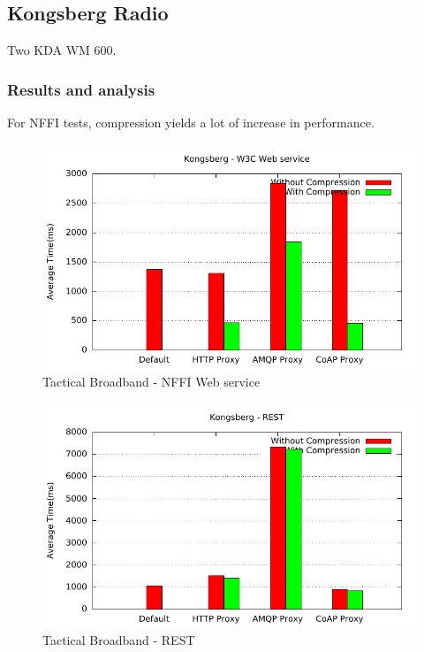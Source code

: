 \subsection{Kongsberg Radio}

Two KDA WM 600.


\subsubsection{Results and analysis}

For NFFI tests, compression yields a lot of increase in performance.

\begin{figure}[H]
\center
\includegraphics[scale=0.75]{../results/kongsberg/nffi/out.pdf}
\caption{Tactical Broadband - NFFI Web service}
\end{figure}

\begin{figure}[H]
\center
\includegraphics[scale=0.75]{../results/kongsberg/rest/out.pdf}
\caption{Tactical Broadband - REST}
\end{figure}

